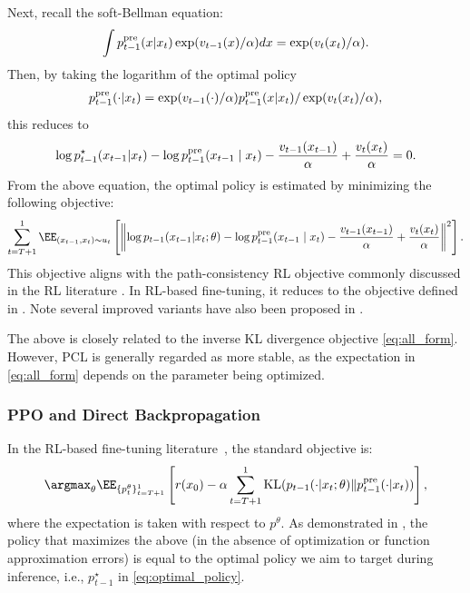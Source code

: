 Next, recall the soft-Bellman equation:
\begin{align*}
    \int p^{\mathrm{pre}}_{t-1}(x|x_{t})\exp(v_{t-1}(x)/\alpha)dx = \exp(v_{t}(x_t)/\alpha). 
\end{align*}
Then, by taking the logarithm of the optimal policy
\begin{align*}
    p^{\mathrm{pre}}_{t-1}(\cdot|x_{t})= \exp(v_{t-1}(\cdot)/\alpha)p^{\mathrm{pre}}_{t-1}(x|x_{t})/ \exp(v_{t}(x_t)/\alpha), 
\end{align*}
this reduces to 
\begin{align*}
     \log p^{\star}_{t-1}(x_{t-1}|x_t) -\log p^{\mathrm{pre}}_{t-1}(x_{t-1}\mid x_t) -\frac{v_{t-1}(x_{t-1})}{\alpha} + \frac{v_{t}(x_{t})}{\alpha}=0. 
\end{align*}
From the above equation, the optimal policy is estimated by minimizing the following objective: 
\begin{align*}
     \sum_{t=T+1}^1  \EE_{(x_{t-1},x_t) \sim u_t} \left[\left \| \log p_{t-1}(x_{t-1}|x_t;\theta) -\log p^{\pre}_{t-1}(x_{t-1}\mid x_t) -\frac{v_{t-1}(x_{t-1})}{\alpha} + \frac{v_{t}(x_{t})}{\alpha}   \right \|^2 \right]. 
\end{align*}
This objective aligns with the path-consistency RL objective commonly discussed in the RL literature \citep{nachum2017bridging}. In RL-based fine-tuning, it reduces to the objective defined in \citet[Algorithm 5]{uehara2024understanding}. Note several improved variants have also been proposed in \citet{rector2024steering,venkatraman2024amortizing}.

The above is closely related to the inverse KL divergence objective \eqref{eq:all_form}. However, PCL is generally regarded as more stable, as the expectation in \eqref{eq:all_form} depends on the parameter being optimized.

\subsubsection{PPO and Direct Backpropagation}

In the RL-based fine-tuning literature~\citep{fan2023dpok,black2023training}, the standard objective is:
\begin{align}\label{eq:PPO}
   \argmax_{\theta} \EE_{\{p^{\theta}_t\}_{t=T+1}^1} \left[r(x_0)- \alpha \sum_{t=T+1}^1 \KL(p_{t-1}(\cdot|x_t;\theta) \| p^{\pre}_{t-1}(\cdot|x_t))   \right], 
\end{align}
where the expectation is taken with respect to $p^{\theta}$. As demonstrated in \citet[Theorem 1]{uehara2024bridging}, the policy that maximizes the above (in the absence of optimization or function approximation errors) is equal to the optimal policy we aim to target during inference, i.e., $p^{\star}_{t-1}$ in \eqref{eq:optimal_policy}. 

